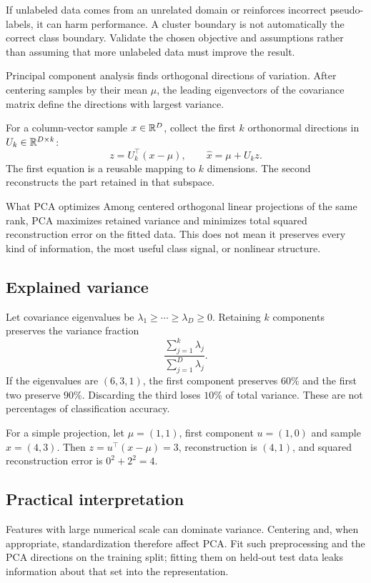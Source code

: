 \documentclass[11pt]{article}
\begin{document}
If unlabeled data comes from an unrelated domain or reinforces incorrect pseudo-labels, it can harm performance. A cluster boundary is not automatically the correct class boundary. Validate the chosen objective and assumptions rather than assuming that more unlabeled data must improve the result.

Principal component analysis finds orthogonal directions of variation. After centering samples by their mean $\mu$, the leading eigenvectors of the covariance matrix define the directions with largest variance.

For a column-vector sample $x\in\mathbb{R}^D$, collect the first $k$ orthonormal directions in $U_k\in\mathbb{R}^{D\times k}$:
\[
z=U_k^\top(x-\mu),\qquad
\widehat{x}=\mu+U_kz.
\]
The first equation is a reusable mapping to $k$ dimensions. The second reconstructs the part retained in that subspace.

\begin{keyidea}{What PCA optimizes}
Among centered orthogonal linear projections of the same rank, PCA maximizes retained variance and minimizes total squared reconstruction error on the fitted data. This does not mean it preserves every kind of information, the most useful class signal, or nonlinear structure.
\end{keyidea}

\subsection{Explained variance}
Let covariance eigenvalues be $\lambda_1\geq\cdots\geq\lambda_D\geq0$. Retaining $k$ components preserves the variance fraction
\[
\frac{\sum_{j=1}^{k}\lambda_j}{\sum_{j=1}^{D}\lambda_j}.
\]
If the eigenvalues are $(6,3,1)$, the first component preserves $60\%$ and the first two preserve $90\%$. Discarding the third loses $10\%$ of total variance. These are not percentages of classification accuracy.

For a simple projection, let $\mu=(1,1)$, first component $u=(1,0)$ and sample $x=(4,3)$. Then $z=u^\top(x-\mu)=3$, reconstruction is $(4,1)$, and squared reconstruction error is $0^2+2^2=4$.

\subsection{Practical interpretation}
Features with large numerical scale can dominate variance. Centering and, when appropriate, standardization therefore affect PCA. Fit such preprocessing and the PCA directions on the training split; fitting them on held-out test data leaks information about that set into the representation.
\end{document}
